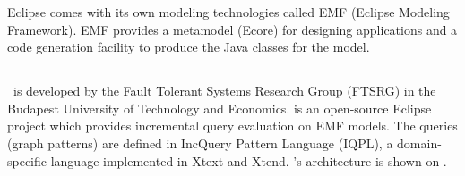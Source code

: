 Eclipse comes with its own modeling technologies called EMF (Eclipse Modeling Framework). EMF provides a metamodel (Ecore) for designing applications and a code generation facility to produce the Java classes for the model.

\subsection{\eiq}
\label{subsec:eiq}

\eiq\ is developed by the Fault Tolerant Systems Research Group (FTSRG) in the Budapest University of Technology and Economics. \eiq is an open-source Eclipse project which provides incremental query evaluation on EMF models. The queries (graph patterns) are defined in IncQuery Pattern Language (IQPL), a domain-specific language implemented in Xtext and Xtend. \eiq's architecture is shown on .


